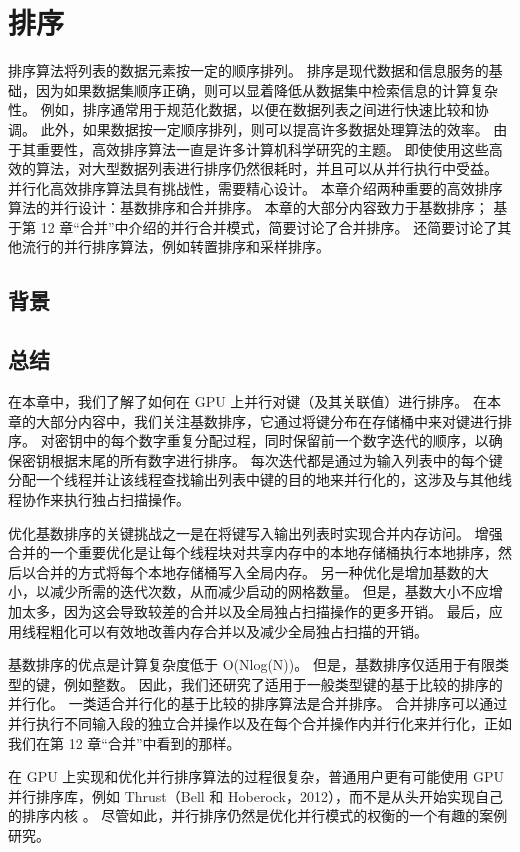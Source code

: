 \section{排序}
排序算法将列表的数据元素按一定的顺序排列。 排序是现代数据和信息服务的基础，因为如果数据集顺序正确，则可以显着降低从数据集中检索信息的计算复杂性。 例如，排序通常用于规范化数据，以便在数据列表之间进行快速比较和协调。 此外，如果数据按一定顺序排列，则可以提高许多数据处理算法的效率。 由于其重要性，高效排序算法一直是许多计算机科学研究的主题。 即使使用这些高效的算法，对大型数据列表进行排序仍然很耗时，并且可以从并行执行中受益。 并行化高效排序算法具有挑战性，需要精心设计。 本章介绍两种重要的高效排序算法的并行设计：基数排序和合并排序。 本章的大部分内容致力于基数排序； 基于第 12 章“合并”中介绍的并行合并模式，简要讨论了合并排序。 还简要讨论了其他流行的并行排序算法，例如转置排序和采样排序。

\subsection{背景}

\subsection{总结}
在本章中，我们了解了如何在 GPU 上并行对键（及其关联值）进行排序。 在本章的大部分内容中，我们关注基数排序，它通过将键分布在存储桶中来对键进行排序。 对密钥中的每个数字重复分配过程，同时保留前一个数字迭代的顺序，以确保密钥根据末尾的所有数字进行排序。 每次迭代都是通过为输入列表中的每个键分配一个线程并让该线程查找输出列表中键的目的地来并行化的，这涉及与其他线程协作来执行独占扫描操作。

优化基数排序的关键挑战之一是在将键写入输出列表时实现合并内存访问。 增强合并的一个重要优化是让每个线程块对共享内存中的本地存储桶执行本地排序，然后以合并的方式将每个本地存储桶写入全局内存。 另一种优化是增加基数的大小，以减少所需的迭代次数，从而减少启动的网格数量。 但是，基数大小不应增加太多，因为这会导致较差的合并以及全局独占扫描操作的更多开销。 最后，应用线程粗化可以有效地改善内存合并以及减少全局独占扫描的开销。

基数排序的优点是计算复杂度低于 O(Nlog(N))。 但是，基数排序仅适用于有限类型的键，例如整数。 因此，我们还研究了适用于一般类型键的基于比较的排序的并行化。 一类适合并行化的基于比较的排序算法是合并排序。 合并排序可以通过并行执行不同输入段的独立合并操作以及在每个合并操作内并行化来并行化，正如我们在第 12 章“合并”中看到的那样。

在 GPU 上实现和优化并行排序算法的过程很复杂，普通用户更有可能使用 GPU 并行排序库，例如 Thrust（Bell 和 Hoberock，2012），而不是从头开始实现自己的排序内核 。 尽管如此，并行排序仍然是优化并行模式的权衡的一个有趣的案例研究。